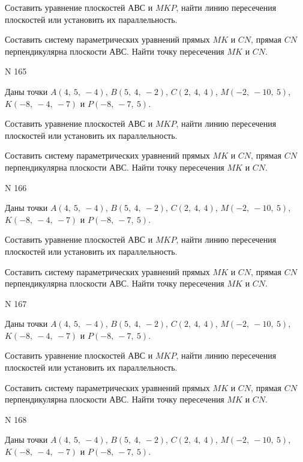 \documentclass[11pt]{report}
\begin{document}
Составить уравнение плоскостей $АВС$ и $MKP$,
найти линию пересечения плоскостей или установить их параллельность.

Составить систему параметрических уравнений прямых $MK$ и $CN$,
прямая $CN$ перпендикулярна плоскости $АВС$. 
Найти точку пересечения $MK$ и $CN$.



 N 165

Даны точки $A\left( 4, \  5, \  -4\right)$, $B\left( 5, \  4, \  -2\right)$, $C\left( 2, \  4, \  4\right)$, $M\left( -2, \  -10, \  5\right)$, $K\left( -8, \  -4, \  -7\right)$ и $P\left( -8, \  -7, \  5\right)$.


Составить уравнение плоскостей $АВС$ и $MKP$,
найти линию пересечения плоскостей или установить их параллельность.

Составить систему параметрических уравнений прямых $MK$ и $CN$,
прямая $CN$ перпендикулярна плоскости $АВС$. 
Найти точку пересечения $MK$ и $CN$.



 N 166

Даны точки $A\left( 4, \  5, \  -4\right)$, $B\left( 5, \  4, \  -2\right)$, $C\left( 2, \  4, \  4\right)$, $M\left( -2, \  -10, \  5\right)$, $K\left( -8, \  -4, \  -7\right)$ и $P\left( -8, \  -7, \  5\right)$.


Составить уравнение плоскостей $АВС$ и $MKP$,
найти линию пересечения плоскостей или установить их параллельность.

Составить систему параметрических уравнений прямых $MK$ и $CN$,
прямая $CN$ перпендикулярна плоскости $АВС$. 
Найти точку пересечения $MK$ и $CN$.



 N 167

Даны точки $A\left( 4, \  5, \  -4\right)$, $B\left( 5, \  4, \  -2\right)$, $C\left( 2, \  4, \  4\right)$, $M\left( -2, \  -10, \  5\right)$, $K\left( -8, \  -4, \  -7\right)$ и $P\left( -8, \  -7, \  5\right)$.


Составить уравнение плоскостей $АВС$ и $MKP$,
найти линию пересечения плоскостей или установить их параллельность.

Составить систему параметрических уравнений прямых $MK$ и $CN$,
прямая $CN$ перпендикулярна плоскости $АВС$. 
Найти точку пересечения $MK$ и $CN$.



 N 168

Даны точки $A\left( 4, \  5, \  -4\right)$, $B\left( 5, \  4, \  -2\right)$, $C\left( 2, \  4, \  4\right)$, $M\left( -2, \  -10, \  5\right)$, $K\left( -8, \  -4, \  -7\right)$ и $P\left( -8, \  -7, \  5\right)$.
\end{document}
